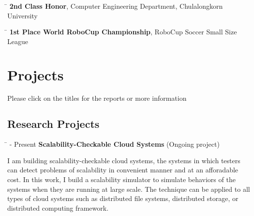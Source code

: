 \documentclass[10pt]{article} %
\begin{document}
\begin{tabbing}
\hspace{2.5cm} \=  \> \textbf{2nd Class Honor}, Computer Engineering Department, Chulalongkorn University
\end{tabbing}

\begin{tabbing}
\hspace{2.5cm} \=  \> \textbf{1st Place World RoboCup Championship}, RoboCup Soccer Small Size League
\end{tabbing}



\section{Projects}
\vspace{-4mm}
{\footnotesize Please click on the titles for the reports or more information}

\subsection{Research Projects}

\begin{tabbing}
\hspace{2.5cm} \=  - Present \>\+ \textbf{Scalability-Checkable Cloud Systems} (Ongoing project) \\
\begin{minipage}{\smallertextwidth}
I am building scalability-checkable cloud systems, the systems in which testers
can detect problems of scalability in convenient manner and at an afforadable
cost. In this work, I build a scalability simulator to simulate behaviors of the
systems when they are running at large scale. The technique can be applied to
all types of cloud systems such as distributed file systems, distributed
storage, or distributed computing framework.
\end{minipage}
\end{tabbing}
\end{document}

